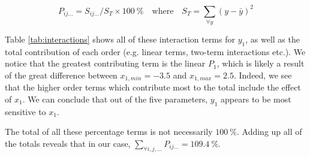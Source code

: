\begin{equation}
	P_{ij\dots} = S_{ij\dots} / S_T \times 100\ \% \quad \text{where} \quad S_T = \sum_{\forall y} (y - \bar{y})^2
\end{equation}

Table \ref{tab:interactions} shows all of these interaction terms for $y_1$, as well as the total contribution of each order (e.g. linear terms, two-term interactions etc.). We notice that the greatest contributing term is the linear $P_1$, which is likely a result of the great difference between $x_{1,min} = -3.5$ and $x_{1,max} = 2.5$. Indeed, we see that the higher order terms which contribute most to the total include the effect of $x_1$. We can conclude that out of the five parameters, $y_1$ appears to be most sensitive to $x_1$.

The total of all these percentage terms is not necessarily $100\ \%$. Adding up all of the totals reveals that in our case, $\sum_{\forall i,j,\dots} P_{ij\dots} = 109.4\ \%$.

